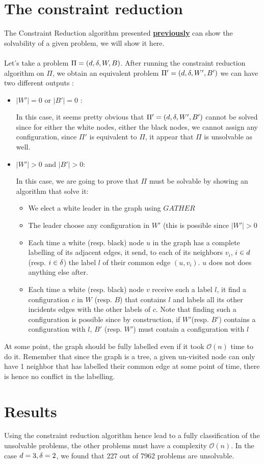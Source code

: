 \section{The constraint reduction}
The Constraint Reduction algorithm presented \hyperref[sec:CR]{\textbf{previously}} can show the solvability of a given problem, we will show it here.\\\\
Let's take a problem $\Pi = (d,\delta,W,B)$. After running the constraint reduction algorithm on $\Pi$, we obtain an equivalent problem $\Pi' = (d,\delta,W',B')$ we can have two different outputs :
\begin{itemize}
    \item $|W'| = 0$ or $|B'| = 0$ :
    
    In this case, it seems pretty obvious that $\Pi' = (d,\delta,W',B')$ cannot be solved since for either the white nodes, either the black nodes, we cannot assign any configuration, since $\Pi'$ is equivalent to $\Pi$, it appear that $\Pi$ is unsolvable as well.
    \item  $|W'| > 0$ and $|B'| > 0$:
    
    In this case, we are going to prove that $\Pi$ must be solvable by showing an algorithm that solve it:
    \begin{itemize}
        \item We elect a white leader in the graph using $GATHER$
        \item The leader choose any configuration in $W'$ (this is possible since $|W'|>0$
        \item Each time a white (resp. black) node $u$ in the graph has a complete labelling of its adjacent edges, it send, to each of its neighbors $v_i$, $i\in d$ (resp. $i\in\delta$) the label $l$ of their common edge $(u,v_i)$. $u$ does not does anything else after.
        \item Each time a white (resp. black) node $v$ receive such a label $l$, it find a configuration $c$ in $W$ (resp. $B$) that contains $l$ and labels all its other incidents edges with the other labels of $c$. Note that finding such a configuration is possible since by construction, if $W'$(resp. $B'$) contains a configuration with $l$, $B'$ (resp. $W'$) must contain a configuration with $l$
    \end{itemize}
\end{itemize}

At some point, the graph should be fully labelled even if it took $\mathcal{O}(n)$ time to do it. Remember that since the graph is a tree, a given un-visited node can only have 1 neighbor that has labelled their common edge at some point of time, there is hence no conflict in the labelling.

\section{Results}
Using the constraint reduction algorithm hence lead to a fully classification of the unsolvable problems, the other problems must have a complexity  $\mathcal{O}(n)$. In the case $d = 3, \delta = 2$, we found that 227 out of 7962 problems are unsolvable.